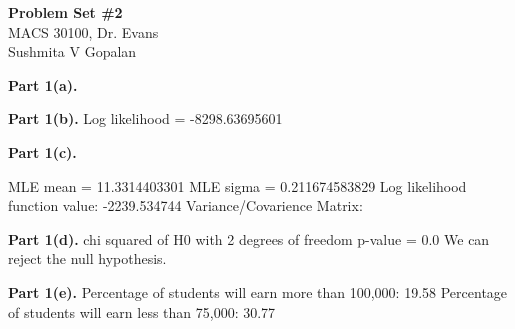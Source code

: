 \documentclass[letterpaper,12pt]{article}
\theoremstyle{definition}
\begin{document}
\begin{flushleft}
  \textbf{\large{Problem Set \#2}} \\
  MACS 30100, Dr. Evans \\
  Sushmita V Gopalan
\end{flushleft}

\vspace{5mm}
\noindent\textbf{Part 1(a).} 

\begin{figure}[htb]\centering\captionsetup{width=4.0in}
\end{figure}
\vspace{5mm} %
\noindent\textbf{Part 1(b).} 
\newline Log likelihood =  -8298.63695601

\begin{figure}[htb]\centering\captionsetup{width=4.0in}
\end{figure}
\vspace{20mm} %

\noindent\textbf{Part 1(c).} 

\begin{figure}[htb]\centering\captionsetup{width=4.0in}
\end{figure}

MLE mean =  11.3314403301 
\newline MLE sigma =  0.211674583829
\newline Log likelihood function value:  -2239.534744
\newline Variance/Covarience Matrix: 
\newline
 [ 0.00014668  0.00017025]
\newline
 [ 0.00017025  0.00030278]
 
\vspace{5mm} %

\noindent\textbf{Part 1(d).} \newline chi squared of H0 with 2 degrees of freedom p-value =  0.0
\newline
We can reject the null hypothesis.
\vspace{5mm} %

\noindent\textbf{Part 1(e).}
\newline Percentage of students will earn more than 100,000:  19.58%
\newline Percentage of students will earn less than 75,000:  30.77%
\end{document}
